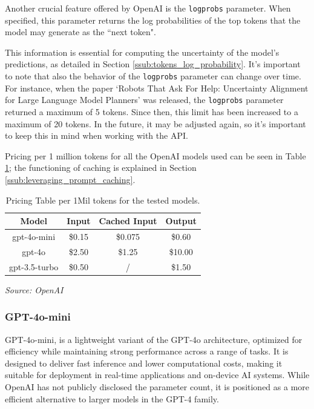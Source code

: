 Another crucial feature offered by OpenAI is the \texttt{logprobs} parameter.
When specified, this parameter returns the log probabilities of the top tokens that
the model may generate as the ``next token".

This information is essential for computing the uncertainty of the model's
predictions, as detailed in Section \ref{ssub:tokens_log_probability}. It's
important to note that also the behavior of the \texttt{logprobs} parameter can change
over time. For instance, when the paper `Robots That Ask For Help: Uncertainty Alignment
for Large Language Model Planners' was released, the \texttt{logprobs} parameter
returned a maximum of 5 tokens. Since then, this limit has been increased to a
maximum of 20 tokens. In the future, it may be adjusted again, so it's important
to keep this in mind when working with the API.

Pricing per 1 million tokens for all the OpenAI models used can be seen in Table
\ref{tab:pricing}; the functioning of caching is explained in Section
\ref{ssub:leveraging_prompt_caching}.

\vspace{3mm}
\begin{table}[h]
  \centering
  \renewcommand{\arraystretch}{1.5}
  \setlength{\tabcolsep}{8pt}
  \begin{tabular}{ c c c c }
    \textbf{Model} & \textbf{Input} & \textbf{Cached Input} & \textbf{Output} \\
    \hline
    gpt-4o-mini    & \$0.15         & \$0.075               & \$0.60          \\
    gpt-4o         & \$2.50         & \$1.25                & \$10.00         \\
    gpt-3.5-turbo  & \$0.50         & /                     & \$1.50          \\
  \end{tabular}
  \caption{Pricing Table per 1Mil tokens for the tested models.}
  {\emph{Source: OpenAI \footnotemark}} \label{tab:pricing}
\end{table}
\vspace{3mm}

\subsubsection{GPT-4o-mini}
GPT-4o-mini, is a lightweight variant of the GPT-4o architecture, optimized for efficiency
while maintaining strong performance across a range of tasks. It is designed to
deliver fast inference and lower computational costs, making it suitable for deployment
in real-time applications and on-device AI systems. While OpenAI has not
publicly disclosed the parameter count, it is positioned as a more efficient alternative
to larger models in the GPT-4 family.

